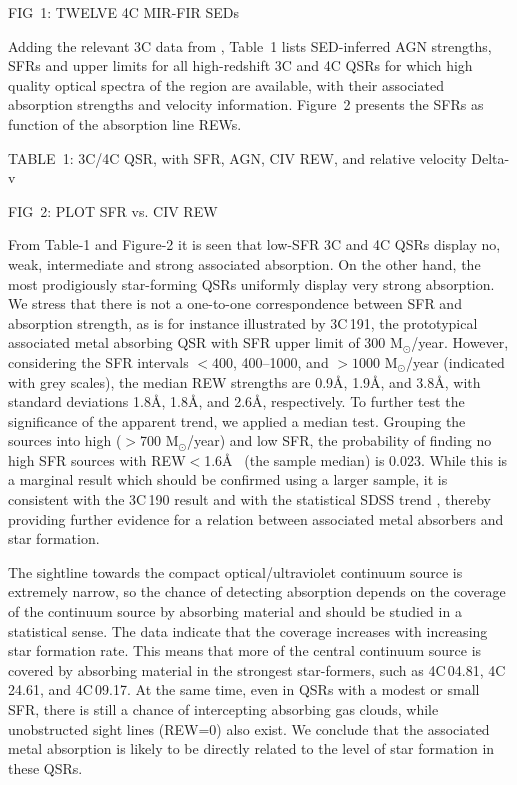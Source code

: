 \documentclass[preprint]{aastex}
\begin{document}
FIG~1: TWELVE 4C MIR-FIR SEDs

Adding the relevant 3C data from \citet{podi15}, Table~1 lists
SED-inferred AGN strengths, SFRs and upper limits for all high-redshift
3C and 4C QSRs for which high quality optical spectra of the 
region are available, with their associated  absorption
strengths and velocity information.  Figure~2 presents the SFRs as
function of the absorption line REWs. 

\newpage

TABLE~1: 3C/4C QSR, with SFR, AGN, CIV REW, and relative velocity Delta-v 

FIG~2: PLOT SFR vs. CIV REW

From Table-1 and Figure-2 it is seen that low-SFR 3C and 4C QSRs display
no, weak, intermediate and strong associated  absorption.  On
the other hand, the most prodigiously star-forming QSRs uniformly
display very strong absorption.  We stress that there is not a
one-to-one correspondence between SFR and absorption strength, as is for
instance illustrated by 3C\,191, the prototypical \citep{williams75,
hamann01} associated metal absorbing QSR with SFR upper limit
\citep{podi15} of 300 M$_{\odot}$/year.  However, considering the SFR
intervals $<400$, 400--1000, and $>1000$ M$_{\odot}$/year (indicated
with grey scales), the median  REW strengths are 0.9\AA,
1.9\AA, and 3.8\AA, with standard deviations 1.8\AA, 1.8\AA, and 2.6\AA,
respectively.  To further test the significance of the apparent trend,
we applied a median test.  Grouping the sources into high ($>$700
M$_{\odot}$/year) and low SFR, the probability of finding no high SFR
sources with REW$<$1.6\AA~ (the sample median) is 0.023.  While this is
a marginal result which should be confirmed using a larger sample, it is
consistent with the 3C\,190 result \citep{stockton01} and with the
statistical SDSS trend \citep{shen12}, thereby providing further
evidence for a relation between associated metal absorbers and star
formation. 

The sightline towards the compact optical/ultraviolet continuum source
is extremely narrow, so the chance of detecting absorption depends on
the coverage of the continuum source by absorbing material and should be
studied in a statistical sense.  The data indicate that the coverage
increases with increasing star formation rate.  This means that more of
the central continuum source is covered by absorbing material in the
strongest star-formers, such as 4C\,04.81, 4C\,24.61, and 4C\,09.17.  At
the same time, even in QSRs with a modest or small SFR, there is still a
chance of intercepting absorbing gas clouds, while unobstructed sight
lines (REW=0) also exist.  We conclude that the associated metal
absorption is likely to be directly related to the level of star
formation in these QSRs. 
\end{document}
